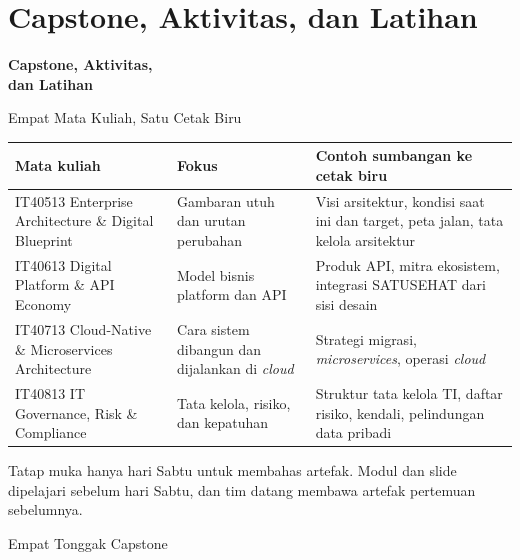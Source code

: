 \documentclass[aspectratio=169, table, 12pt]{beamer}
\begin{document}
\section{Capstone, Aktivitas, dan Latihan}

\begin{frame}{\hfill}
  \centering
  \Huge{\textbf{Capstone, Aktivitas,\\dan Latihan}}
\end{frame}

\begin{frame}{{\Large Empat Mata Kuliah, Satu Cetak Biru}}
  \scriptsize
  \begin{tabularx}{\textwidth}{>{\raggedright\arraybackslash}p{3.5cm}
      >{\raggedright\arraybackslash}X >{\raggedright\arraybackslash}X}
    \hline
    \textbf{Mata kuliah} & \textbf{Fokus} & \textbf{Contoh sumbangan ke cetak biru} \\
    \hline
    IT40513 Enterprise Architecture \& Digital Blueprint & Gambaran utuh dan urutan perubahan & Visi arsitektur, kondisi saat ini dan target, peta jalan, tata kelola arsitektur \\
    \hline
    IT40613 Digital Platform \& API Economy & Model bisnis platform dan API & Produk API, mitra ekosistem, integrasi SATUSEHAT dari sisi desain \\
    \hline
    IT40713 Cloud-Native \& Microservices Architecture & Cara sistem dibangun dan dijalankan di \textit{cloud} & Strategi migrasi, \textit{microservices}, operasi \textit{cloud} \\
    \hline
    IT40813 IT Governance, Risk \& Compliance & Tata kelola, risiko, dan kepatuhan & Struktur tata kelola TI, daftar risiko, kendali, pelindungan data pribadi \\
    \hline
  \end{tabularx}

  \vspace{6pt}
  \small Tatap muka hanya hari Sabtu untuk membahas artefak. Modul dan slide dipelajari sebelum hari
  Sabtu, dan tim datang membawa artefak pertemuan sebelumnya.
\end{frame}

\begin{frame}{{\Large Empat Tonggak Capstone}}
  \centering
\end{frame}
\end{document}
